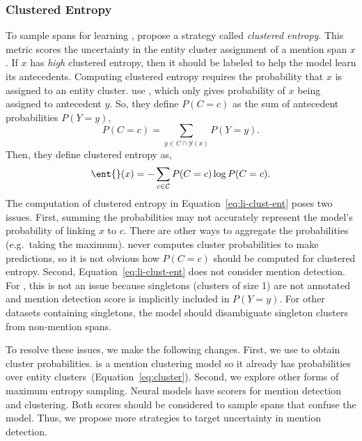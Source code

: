 \subsubsection{Clustered Entropy}
\label{ssec:clust-ent}

To sample spans for learning \coref{}, \citet{li-2020} propose a strategy called
\emph{clustered entropy}.  This metric scores the uncertainty in the entity
cluster assignment of a mention span $x$. If $x$ has \emph{high} clustered entropy,
then it should be labeled to help the model learn its antecedents. Computing clustered entropy
requires the probability that $x$ is assigned to an entity cluster.
\citet{li-2020} use \ctof{}, which only gives probability of $x$ being
assigned to antecedent $y$. So, they define $P(C=c)$ as the sum of antecedent probabilities $P(Y=y)$,
\begin{equation}
    P(C=c) = \sum_{y \in C \cap \mathcal{Y}(x)} P(Y=y).
\end{equation}
Then, they define clustered entropy as,
\begin{equation}
    \ent{}(x) = -\sum_{c \in \mathcal{C}} P(C=c) \log P(C=c).
    \label{eq:li-clust-ent}
\end{equation}
The computation of clustered entropy in Equation~\ref{eq:li-clust-ent} poses two issues.
First, summing the probabilities may not accurately represent the model's probability of linking $x$ to $c$.
There are other ways to aggregate the probabilities (e.g.~taking the maximum).
\ctof{} never computes cluster probabilities to make predictions, so it is not obvious how $P(C=c)$ should be computed for clustered entropy.
Second, Equation~\ref{eq:li-clust-ent} does
not consider mention detection.  For \ontonotes{}, this is not an issue
because singletons (clusters of size 1) are not annotated and mention detection
score is implicitly included in $P(Y=y)$.
For other datasets containing singletons, the model should disambiguate
singleton clusters from non-mention spans.

To resolve these issues,
we make the following changes. First, we use \icoref{} to obtain cluster
probabilities. \icoref{} is a
mention clustering model so it already has probabilities over
entity clusters~(Equation~\ref{eq:cluster}).  Second, we explore other forms of
maximum entropy sampling.  Neural \coref{} models have scorers for mention
detection and clustering.  Both scores should be considered
to sample spans that confuse the model.
Thus, we propose more strategies to target uncertainty in mention detection.

